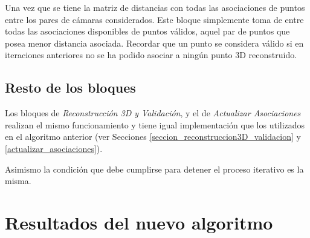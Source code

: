 Una vez que se tiene la matriz de distancias con todas las asociaciones de puntos entre los pares de cámaras considerados. Este bloque simplemente toma de entre todas las asociaciones disponibles de puntos válidos, aquel par de puntos que posea menor distancia asociada.
Recordar que un punto se considera válido si en iteraciones anteriores no se ha podido asociar a ningún punto 3D reconstruido.

\subsection{Resto de los bloques}

Los bloques de \emph{Reconstrucción 3D y Validación}, y el de \emph{Actualizar Asociaciones} realizan el mismo funcionamiento y tiene igual implementación que los utilizados en el algoritmo anterior (ver Secciones \ref{seccion_reconstruccion3D_validacion} y \ref{actualizar_asociaciones}).

  Asimismo la condición que debe cumplirse para detener el proceso iterativo es la misma.

  
  
\section{Resultados del nuevo algoritmo}  


